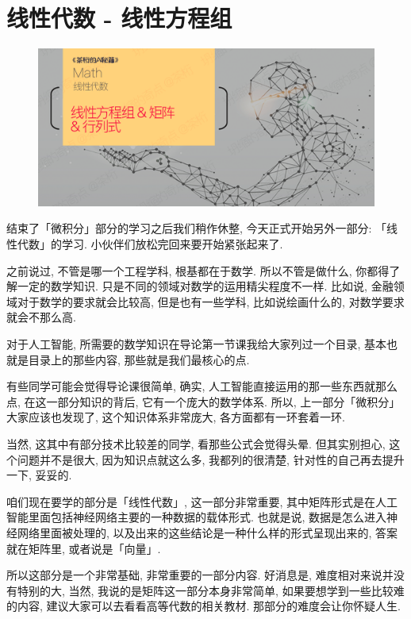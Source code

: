 \chapter{线性代数 - 线性方程组}

\begin{figure}[ht]
  \centering
  \includegraphics[width=1\linewidth]{asset/茶桁的AI秘籍_Math_14.png}
\end{figure}

\newpage

结束了「微积分」部分的学习之后我们稍作休整, 今天正式开始另外一部分: 「线性代数」的学习. 小伙伴们放松完回来要开始紧张起来了. 

之前说过, 不管是哪一个工程学科, 根基都在于数学. 所以不管是做什么, 你都得了解一定的数学知识. 只是不同的领域对数学的运用精尖程度不一样. 比如说, 金融领域对于数学的要求就会比较高, 但是也有一些学科, 比如说绘画什么的, 对数学要求就会不那么高. 

对于人工智能, 所需要的数学知识在导论第一节课我给大家列过一个目录, 基本也就是目录上的那些内容, 那些就是我们最核心的点. 

有些同学可能会觉得导论课很简单, 确实, 人工智能直接运用的那一些东西就那么点, 在这一部分知识的背后, 它有一个庞大的数学体系. 所以, 上一部分「微积分」大家应该也发现了, 这个知识体系非常庞大, 各方面都有一环套着一环. 

当然, 这其中有部分技术比较差的同学, 看那些公式会觉得头晕. 但其实别担心, 这个问题并不是很大, 因为知识点就这么多, 我都列的很清楚, 针对性的自己再去提升一下, 妥妥的. 

咱们现在要学的部分是「线性代数」, 这一部分非常重要, 其中矩阵形式是在人工智能里面包括神经网络主要的一种数据的载体形式. 也就是说, 数据是怎么进入神经网络里面被处理的, 以及出来的这些结论是一种什么样的形式呈现出来的, 答案就在矩阵里, 或者说是「向量」. 

所以这部分是一个非常基础, 非常重要的一部分内容. 好消息是, 难度相对来说并没有特别的大, 当然, 我说的是矩阵这一部分本身非常简单, 如果要想学到一些比较难的内容, 建议大家可以去看看高等代数的相关教材. 那部分的难度会让你怀疑人生.

